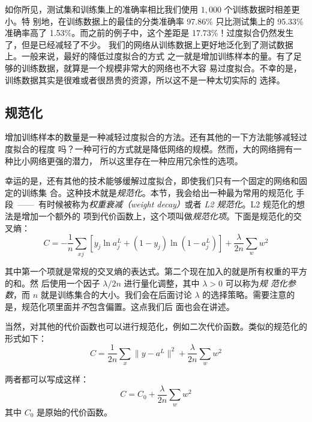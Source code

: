 如你所见，测试集和训练集上的准确率相比我们使用 $1,000$ 个训练数据时相差更小。特
别地，在训练数据上的最佳的分类准确率 97.86\% 只比测试集上的 95.33\% 准确率高了
1.53\%。而之前的例子中，这个差距是 17.73\%！过度拟合仍然发生了，但是已经减轻了不少。
我们的网络从训练数据上更好地泛化到了测试数据上。一般来说，最好的降低过度拟合的方式
之一就是增加训练样本的量。有了足够的训练数据，就算是一个规模非常大的网络也不大容
易过度拟合。不幸的是，训练数据其实是很难或者很昂贵的资源，所以这不是一种太切实际的
选择。

\subsection{规范化}

增加训练样本的数量是一种减轻过度拟合的方法。还有其他的一下方法能够减轻过度拟合的程度
吗？一种可行的方式就是降低网络的规模。然而，大的网络拥有一种比小网络更强的潜力，
所以这里存在一种应用冗余性的选项。

幸运的是，还有其他的技术能够缓解过度拟合，即使我们只有一个固定的网络和固定的训练集
合。这种技术就是\emph{规范化}。本节，我会给出一种最为常用的规范化
手段~——~有时候被称为\emph{权重衰减（weight decay）}或者 \emph{L2 规范化}。L2 规范化的想法是增加一个额外的
项到代价函数上，这个项叫做\emph{规范化项}。下面是规范化的交叉熵：
\begin{equation}
  C = -\frac{1}{n} \sum_{xj} \left[ y_j \ln a^L_j+(1-y_j) \ln
  (1-a^L_j)\right] + \frac{\lambda}{2n} \sum_w w^2
\label{eq:85}\tag{85}
\end{equation}

其中第一个项就是常规的交叉熵的表达式。第二个现在加入的就是所有权重的平方的和。然
后使用一个因子 $\lambda / 2n$ 进行量化调整，其中 $\lambda > 0$ 可以称为\emph{规
  范化参数}，而 $n$ 就是训练集合的大小。我们会在后面讨论
$\lambda$ 的选择策略。需要注意的是，规范化项里面并\emph{不}包含偏置。这点我们后
面也会在讲述。

当然，对其他的代价函数也可以进行规范化，例如二次代价函数。类似的规范化的形式如下：
\begin{equation}
  C = \frac{1}{2n} \sum_x \|y-a^L\|^2 + \frac{\lambda}{2n} \sum_w w^2
  \label{eq:86}\tag{86}
\end{equation}

两者都可以写成这样：
\begin{equation}
  C = C_0 + \frac{\lambda}{2n} \sum_w w^2
  \label{eq:87}\tag{87}
\end{equation}
其中 $C_0$ 是原始的代价函数。

